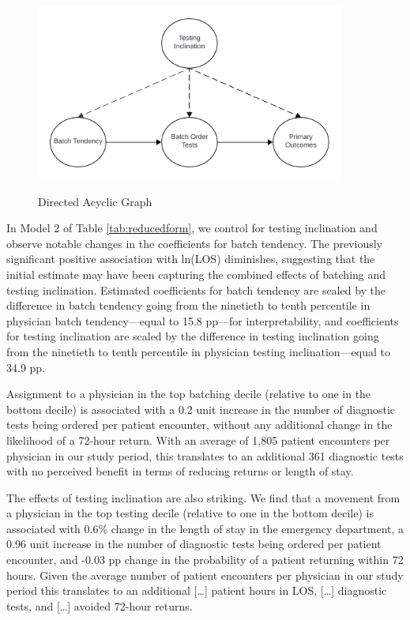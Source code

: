 \documentclass[,,nonblindrev]{informs}
\begin{document}
\begin{figure}[h]
  \centering
  \includegraphics[width=4in]{../outputs/figures/DAG.png}
\begin{tablenotes}
\small
\item \textit{}
\end{tablenotes}  
  \caption{Directed Acyclic Graph}
  \label{fig:DAG}
\end{figure}

In Model 2 of Table \ref{tab:reducedform}, we control for testing
inclination and observe notable changes in the coefficients for batch
tendency. The previously significant positive association with ln(LOS)
diminishes, suggesting that the initial estimate may have been capturing
the combined effects of batching and testing inclination. Estimated
coefficients for batch tendency are scaled by the difference in batch
tendency going from the ninetieth to tenth percentile in physician batch
tendency---equal to 15.8 pp---for interpretability, and coefficients for
testing inclination are scaled by the difference in testing inclination
going from the ninetieth to tenth percentile in physician testing
inclination---equal to 34.9 pp.

Assignment to a physician in the top batching decile (relative to one in
the bottom decile) is associated with a 0.2 unit increase in the number
of diagnostic tests being ordered per patient encounter, without any
additional change in the likelihood of a 72-hour return. With an average
of 1,805 patient encounters per physician in our study period, this
translates to an additional 361 diagnostic tests with no perceived
benefit in terms of reducing returns or length of stay.

The effects of testing inclination are also striking. We find that a
movement from a physician in the top testing decile (relative to one in
the bottom decile) is associated with 0.6\% change in the length of stay
in the emergency department, a 0.96 unit increase in the number of
diagnostic tests being ordered per patient encounter, and -0.03 pp
change in the probability of a patient returning within 72 hours. Given
the average number of patient encounters per physician in our study
period this translates to an additional {[}\ldots{]} patient hours in
LOS, {[}\ldots{]} diagnostic tests, and {[}\ldots{]} avoided 72-hour
returns.
\end{document}
